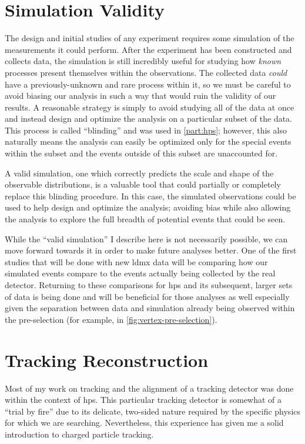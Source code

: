 \section{Simulation Validity}
The design and initial studies of any experiment requires some simulation
of the measurements it could perform.
After the experiment has been constructed and collects data, the simulation
is still incredibly useful for studying how \emph{known} processes present
themselves within the observations.
The collected data \emph{could} have a previously-unknown and rare process
within it, so we must be careful to avoid biasing our analysis in such a
way that would ruin the validity of our results.
A reasonable strategy is simply to avoid studying all of the data at once
and instead design and optimize the analysis on a particular subset of the
data.
This process is called ``blinding'' and was used in \cref{part:hps};
however, this also naturally means the analysis can easily be optimized
only for the special events within the subset and the events outside of
this subset are unaccounted for.

A valid simulation, one which correctly predicts the scale and shape
of the observable distributions, is a valuable tool that could partially
or completely replace this blinding procedure.
In this case, the simulated observations could be used to help design
and optimize the analysis; avoiding bias while also allowing the analysis
to explore the full breadth of potential events that could be seen.

While the ``valid simulation'' I describe here is not necessarily possible,
we can move forward towards it in order to make future analyses better.
One of the first studies that will be done with new \ac{ldmx} data will
be comparing how our simulated events compare to the events actually being
collected by the real detector.
Returning to these comparisons for \ac{hps} and its subsequent, larger
sets of data is being done and will be beneficial for those analyses as well
especially given the separation between data and simulation already being
observed within the pre-selection (for example, in \cref{fig:vertex-pre-selection}).

\section{Tracking Reconstruction}
Most of my work on tracking and the alignment of a tracking detector
was done within the context of \ac{hps}.
This particular tracking detector is somewhat of a ``trial by fire'' due
to its delicate, two-sided nature required by the specific physics for
which we are searching.
Nevertheless, this experience has given me a solid introduction to charged
particle tracking.

